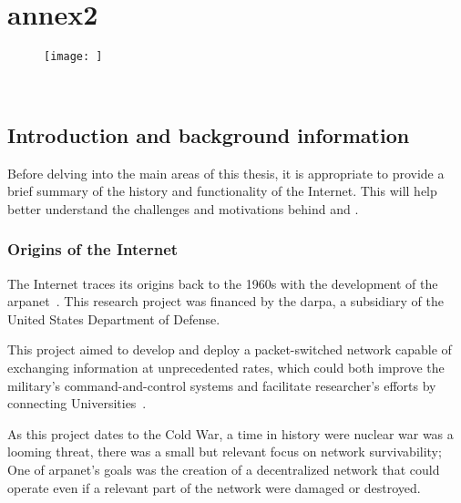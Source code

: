 
%

\chapter{annex2}
\label{ann:2}

\begin{figure}[htbp]
\centering
\texttt{[image: ]}
   	\caption{~\cite{}}
   	\label{fig:c}
\end{figure}

\section{Introduction and background information}
\label{sec:intro}

Before delving into the main areas of this thesis, it is appropriate to provide a brief summary of the history and functionality of the Internet. This will help better understand the challenges and motivations behind  and .
\subsection{Origins of the Internet} %
The Internet traces its origins back to the 1960s with the development of the \gls{arpanet}~\cite{leiner_brief_2009}. This research project was financed by the \gls{darpa}, a subsidiary of the United States Department of Defense.

This project aimed to develop and deploy a packet-switched network capable of exchanging information at unprecedented rates, which could both improve the military's command-and-control systems and facilitate researcher's efforts by connecting Universities~\cite{interview_Dr_Charles_Herzfeld}.



As this project dates to the Cold War, a time in history were nuclear war was a looming threat, there was a small but relevant focus on network survivability; One of \gls{arpanet}’s goals was the creation of a decentralized network that could operate even if a relevant part of the network were damaged or destroyed. 


